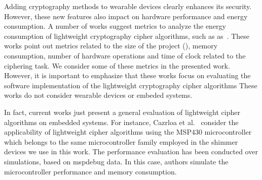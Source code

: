 
Adding cryptography methods to wearable devices clearly enhances its security. However, these new features also impact on hardware performance and energy consumption.
A number of works suggest metrics to analyze the energy consumption of lightweight cryptography cipher algorithms, such as as~\cite{eisenbarth2012compact,kerckhof2012towards,eisenbarth2007survey}. These works point out metrics related to the size of the project (), memory consumption, number of hardware operations and time of clock related to the ciphering task. We consider some of these metrics in the presented work. However, it is important to emphasize that these works focus on evaluating the software implementation of the lightweight cryptography cipher algorithms  These works do not consider wearable devices or embeded systems.


In fact, current works just present a general evaluation of lightweight cipher algorithms on embedded systems. For instance, Cazrloa et al.~\cite{cazorla2013survey} consider the applicability of lightweight cipher algorithms using the MSP430 microcontroller which belongs to the same microcontroller family employed in the shimmer devices we use in this work. The performance evaluation has been conducted over simulations, based on mspdebug data. In this case, authors simulate the microcontroller performance and memory consumption.

